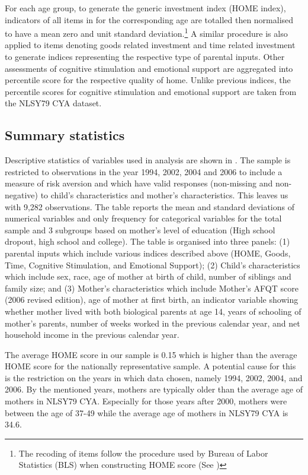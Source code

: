 \documentclass[]{article}
\begin{document}
For each age group, to generate the generic investment index (HOME index), indicators of all items in  for the corresponding age are totalled then normalised to have a mean zero and unit standard deviation.\footnote{The recoding of items follow the procedure used by Bureau of Labor Statistics (BLS) when constructing HOME score (See \citet{center2004nlsy79})} A similar procedure is also applied to items denoting goods related investment and time related investment to generate indices representing the respective type of parental inputs. Other assessments of cognitive stimulation and emotional support are aggregated into percentile score for the respective quality of home. Unlike previous indices, the percentile scores for cognitive  stimulation and emotional support are taken from the NLSY79 CYA dataset.




\subsection{Summary statistics}
Descriptive statistics of variables used in analysis are shown in . The sample is restricted to observations in the year 1994, 2002, 2004 and 2006 to include a measure of risk aversion and which have valid responses (non-missing and non-negative) to child's characteristics and mother's characteristics. This leaves us with 9,282 observations. The table reports the mean and standard deviations of numerical variables and only frequency for categorical variables for the total sample and 3 subgroups based on mother's level of education (High school dropout, high school and college). The table is organised into three panels: (1) parental inputs which include various indices described above (HOME, Goods, Time, Cognitive Stimulation, and Emotional Support); (2) Child's characteristics which include sex, race, age of mother at birth of child, number of siblings and family size; and (3) Mother's characteristics which include Mother's AFQT score (2006 revised edition), age of mother at first birth, an indicator variable showing whether mother lived with both biological parents at age 14, years of schooling of mother's parents, number of weeks worked in the previous calendar year, and net household income in the previous calendar year.



The average HOME score in our sample is 0.15 which is higher than the average HOME score for the nationally representative sample. A potential cause for this is the restriction on the years in which data chosen, namely 1994, 2002, 2004, and 2006. By the mentioned years, mothers are typically older than the average age of mothers in NLSY79 CYA. Especially for those years after 2000, mothers were between the age of 37-49 while the average age of mothers in NLSY79 CYA is 34.6.
\end{document}
